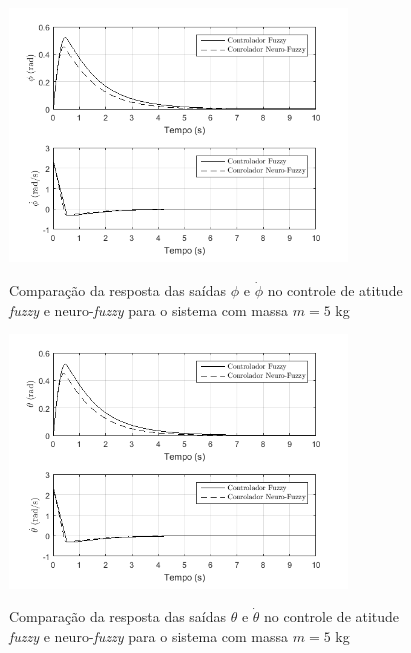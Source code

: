 \begin{figure}[!htb]
    \centering
    \caption{Comparação da resposta das saídas $\phi$ e $\dot{\phi}$ no controle de atitude \textit{fuzzy} e neuro-\textit{fuzzy} para o sistema com massa $m=5$ kg}
    \includegraphics[width=0.8\textwidth]{./04-figuras/resultados/novos/atitude_phi_phidot_5kg_10s}
    \label{fig:atitude_phi_phidot_5kg_10s}
\end{figure}

\begin{figure}[!htb]
    \centering
    \caption{Comparação da resposta das saídas $\theta$ e $\dot{\theta}$ no controle de atitude \textit{fuzzy} e neuro-\textit{fuzzy} para o sistema com massa $m=5$ kg}
    \includegraphics[width=0.8\textwidth]{./04-figuras/resultados/novos/atitude_theta_thetadot_5kg_10s}
    \label{fig:atitude_theta_thetadot_5kg_10s}
\end{figure}




